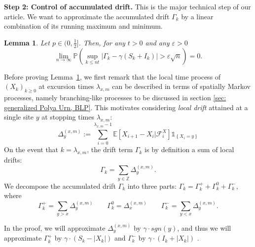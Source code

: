 \documentclass[twoside,12pt, a4paper]{article}
\newtheorem{lemma}{Lemma}[section]
\numberwithin{equation}{section}
\theoremstyle{remark}
\newcommand{\abs}[1]{\left\vert #1 \right\vert}
\newcommand\TBD{\textcolor{red}{TBD.}}
\newcommand{\comment}[1]{\textcolor{blue}{(Comment: #1)}}
\begin{document}
	\textbf{Step 2: Control of accumulated drift.} This is the major technical step of our article. We want to approximate the accumulated drift $\Gamma_k$ by a linear combination of its running maximum and minimum.
	\begin{lemma}\label{lm: control of acc drift}
		Let $p\in (0,\frac{1}{2}]$. Then, for any $t>0$ and any $\varepsilon >0$
		\begin{equation}\label{eq: control of acc drift}
			\lim_{n \to \infty }\mathbb{P}\left(\sup_{k\leq nt} \abs{\Gamma_k - \gamma \left(S_k + I_k \right)   } > \varepsilon \sqrt{n}  \right) =0. 
		\end{equation}
	\end{lemma}
	Before proving Lemma~\ref{lm: control of acc drift}, we first remark that the local time process of $(X_k)_{k \ge 0}$ at excursion times $\lambda_{x,m}$ can be described in terms of spatially Markov processes, namely branching-like processes to be discussed in section \ref{sec: generalized Polya Urn, BLP}. This motivates considering \textit{local drift} attained at a single site $y$ at stopping times $\lambda_{x, m}$:
	\begin{equation}\label{eq: accumulated local drift}
		\Delta_y^{(x,m)}:= \sum_{i=0}^{\lambda_{x,m}-1} \mathbb{E}\left[X_{i+1}-X_i\vert \mathcal{F}_{i}^X\right] \mathbb{1}_{\left\{X_i=y\right\}}
	\end{equation}
	On the event that $k = \lambda_{x,m}$, the drift term $\Gamma_k$ is by definition a sum of local drifts:
	\begin{equation}\label{eq: drift in terms of local drifts}
		\Gamma_k = \sum_{y\in \mathbb{Z}} \Delta_y^{(x,m)}
		.\end{equation}
	We decompose the accumulated drift $\Gamma_k$ into three parts: $\Gamma_k = 	\Gamma_k^+ +	\Gamma_k^0 + \Gamma_k^-$, where 
	\[
	\Gamma_k^{+} = \sum_{y > x} \Delta_y^{(x,m)}\qquad 
	\Gamma_k^{0} = \Delta_x^{(x,m)} \qquad
	\Gamma_k^{-} = \sum_{y < x} \Delta_y^{(x,m)}
	.\]
	\iffalse
	\begin{align*}
		\Gamma_k^{+ \phantom{0}} &= \sum_{y > x} \Delta_y^{(x,m)}\\
		\Gamma_k^{0 \phantom{+}} &= \Delta_x^{(x,m)} \\[0.6em]
		\Gamma_k^{- \phantom{0}} &= \sum_{y < x} \Delta_{y}^{(x,m)}
		.\end{align*} 
	\fi
	In the proof, we will approximate $\Delta_y^{(x,m)}$ by $\gamma\cdot sgn(y)$, and thus we will approximate $\Gamma_k^+$ by $\gamma \cdot (S_k - \abs{X_k})$ and $\Gamma_k^-$ by $ \gamma \cdot (I_k + \abs{X_k} )$
	.
	
\end{document}
